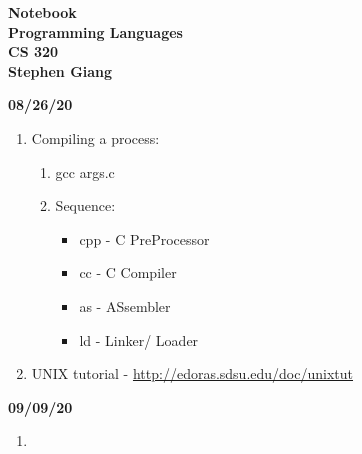 \documentclass[11pt]{article}
\newcommand{\skipline}{\vspace{\baselineskip}}
\begin{document}
	
	\begin{center}
		\textbf{Notebook} \\
		\textbf{Programming Languages} \\
		\textbf{CS 320} \\
		\textbf{Stephen Giang} \\
	\end{center}
	
	\textbf{08/26/20}
	\begin{enumerate}
		\item Compiling a process:
		\begin{enumerate}
			\item gcc args.c
			\item Sequence:
				\begin{itemize}[label = \textendash]
					\item cpp - C PreProcessor 
					\item cc - C Compiler
					\item as - ASsembler
					\item ld - Linker/ Loader
				\end{itemize}
		\end{enumerate}
		\item UNIX tutorial - \url{http://edoras.sdsu.edu/doc/unixtut}
	\end{enumerate}
	\skipline
	\textbf{09/09/20}
	\begin{enumerate}
		\item 
	\end{enumerate}
\end{document}

